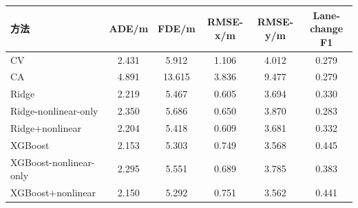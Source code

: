 \begin{tabular}{lccccc}
\toprule
方法 & ADE/m & FDE/m & RMSE-x/m & RMSE-y/m & Lane-change F1 \\ 
\midrule
CV & 2.431 & 5.912 & 1.106 & 4.012 & 0.279 \\ 
CA & 4.891 & 13.615 & 3.836 & 9.477 & 0.279 \\ 
Ridge & 2.219 & 5.467 & 0.605 & 3.694 & 0.330 \\ 
Ridge-nonlinear-only & 2.350 & 5.686 & 0.650 & 3.870 & 0.283 \\ 
Ridge+nonlinear & 2.204 & 5.418 & 0.609 & 3.681 & 0.332 \\ 
XGBoost & 2.153 & 5.303 & 0.749 & 3.568 & 0.445 \\ 
XGBoost-nonlinear-only & 2.295 & 5.551 & 0.689 & 3.785 & 0.383 \\ 
XGBoost+nonlinear & 2.150 & 5.292 & 0.751 & 3.562 & 0.441 \\ 
\bottomrule
\end{tabular}
